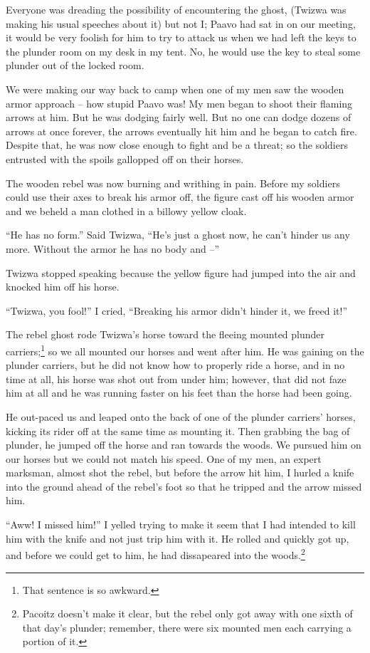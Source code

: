 Everyone was dreading the possibility of encountering the ghost, (Twizwa was making his usual speeches about it) but not I; Paavo had sat in on our meeting, it would be very foolish for him to try to attack us when we had left the keys to the plunder room on my desk in my tent. No, he would use the key to steal some plunder out of the locked room.

We were making our way back to camp when one of my men saw the wooden armor approach -- how stupid Paavo was! My men began to shoot their flaming arrows at him. But he was dodging fairly well. But no one can dodge dozens of arrows at once forever, the arrows eventually hit him and he began to catch fire. Despite that, he was now close enough to fight and be a threat; so the soldiers entrusted with the spoils gallopped off on their horses.

The wooden rebel was now burning and writhing in pain. Before my soldiers could use their axes to break his armor off, the figure cast off his wooden armor and we beheld a man clothed in a billowy yellow cloak.

``He has no form.'' Said Twizwa, ``He's just a ghost now, he can't hinder us any more. Without the armor he has no body and --''

Twizwa stopped speaking because the yellow figure had jumped into the air and knocked him off his horse.

``Twizwa, you fool!'' I cried, ``Breaking his armor didn't hinder it, we freed it!''

The rebel ghost rode Twizwa's horse toward the fleeing mounted plunder carriers;\footnote{That sentence is so awkward.} so we all mounted our horses and went after him. He was gaining on the plunder carriers, but he did not know how to properly ride a horse, and in no time at all, his horse was shot out from under him; however, that did not faze him at all and he was running faster on his feet than the horse had been going.

He out-paced us and leaped onto the back of one of the plunder carriers' horses, kicking its rider off at the same time as mounting it. Then grabbing the bag of plunder, he jumped off the horse and ran towards the woods. We pursued him on our horses but we could not match his speed. One of my men, an expert marksman, almost shot the rebel, but before the arrow hit him, I hurled a knife into the ground ahead of the rebel's foot so that he tripped and the arrow missed him.

``Aww! I missed him!'' I yelled trying to make it seem that I had intended to kill him with the knife and not just trip him with it. He rolled and quickly got up, and before we could get to him, he had dissapeared into the woods.\footnote{Pacoitz doesn't make it clear, but the rebel only got away with one sixth of that day's plunder; remember, there were six mounted men each carrying a portion of it.} 

